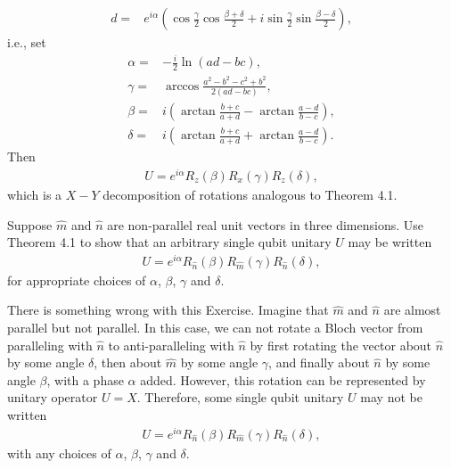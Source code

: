 \documentclass[en]{sol-man}
\begin{document}
\begin{sol}
\begin{align}
        d=&e^{i\alpha}\left(\cos\frac{\gamma}{2}\cos\frac{\beta+\delta}{2}+i\sin\frac{\gamma}{2}\sin\frac{\beta-\delta}{2}\right),
    \end{align}
    i.e., set
    \begin{align}
        \alpha=&-\frac{i}{2}\ln(ad-bc),\\
        \gamma=&\arccos\frac{a^2-b^2-c^2+b^2}{2(ad-bc)},\\
        \beta=&i\left(\arctan\frac{b+c}{a+d}-\arctan\frac{a-d}{b-c}\right),\\
        \delta=&i\left(\arctan\frac{b+c}{a+d}+\arctan\frac{a-d}{b-c}\right).
    \end{align}
    Then
    \begin{align}
        U=e^{i\alpha}R_z(\beta)R_x(\gamma)R_z(\delta),
    \end{align}
    which is a $X-Y$ decomposition of rotations analogous to Theorem 4.1.
\end{sol}

\begin{exe}
    Suppose $\hat{m}$ and $\hat{n}$ are non-parallel real unit vectors in three dimensions. Use Theorem 4.1 to show that an arbitrary single qubit unitary $U$ may be written
    \begin{align}
        U=e^{i\alpha}R_{\hat{n}}(\beta)R_{\hat{m}}(\gamma)R_{\hat{n}}(\delta),
    \end{align}
    for appropriate choices of $\alpha$, $\beta$, $\gamma$ and $\delta$.
\end{exe}
\begin{pf}
    There is something wrong with this Exercise. Imagine that $\hat{m}$ and $\hat{n}$ are almost parallel but not parallel. In this case, we can not rotate a Bloch vector from paralleling with $\hat{n}$ to anti-paralleling with $\hat{n}$ by first rotating the vector about $\hat{n}$ by some angle $\delta$, then about $\hat{m}$ by some angle $\gamma$, and finally about $\hat{n}$ by some angle $\beta$, with a phase $\alpha$ added. However, this rotation can be represented by unitary operator $U=X$. Therefore, some single qubit unitary $U$ may not be written
    \begin{align}
        U=e^{i\alpha}R_{\hat{n}}(\beta)R_{\hat{m}}(\gamma)R_{\hat{n}}(\delta),
    \end{align}
    with any choices of $\alpha$, $\beta$, $\gamma$ and $\delta$.
\end{pf}
\end{document}
